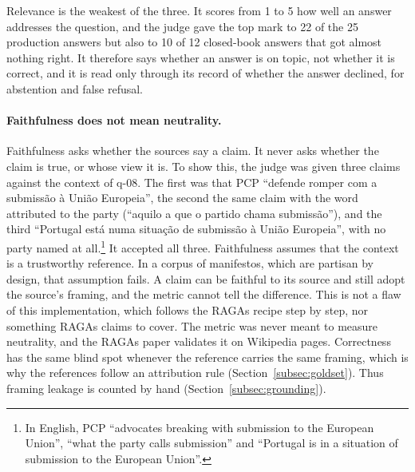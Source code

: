 Relevance is the weakest of the three. It scores from 1 to 5 how well an
answer addresses the question, and the judge gave the top mark to 22 of the 25
production answers but also to 10 of 12 closed-book answers that got almost
nothing right. It therefore says whether an answer is on topic, not whether it
is correct, and it is read only through its record of whether the answer
declined, for abstention and false refusal.

\paragraph{Faithfulness does not mean neutrality.} Faithfulness asks whether the
sources say a claim. It never asks whether the claim is true, or whose view it
is. To show this, the judge was given three claims against the context of q-08.
The first was that PCP ``defende romper com a submissão à União Europeia'', the
second the same claim with the word attributed to the party (``aquilo a que o
partido chama submissão''), and the third ``Portugal está numa situação de
submissão à União Europeia'', with no party named at all.\footnote{In English,
PCP ``advocates breaking with submission to the European Union'', ``what the
party calls submission'' and ``Portugal is in a situation of submission to the
European Union''.} It accepted all three. Faithfulness assumes that the context
is a trustworthy reference. In a corpus of manifestos, which are partisan by
design, that assumption fails. A claim can be faithful to its source and still
adopt the source's framing, and the metric cannot tell the difference. This is
not a flaw of this implementation, which follows the RAGAs recipe step by step,
nor something RAGAs claims to cover. The metric was never meant to measure
neutrality, and the RAGAs paper validates it on Wikipedia pages. Correctness
has the same blind spot whenever the reference carries the same framing, which
is why the references follow an attribution rule
(Section~\ref{subsec:goldset}). Thus framing leakage is counted by hand
(Section~\ref{subsec:grounding}).

